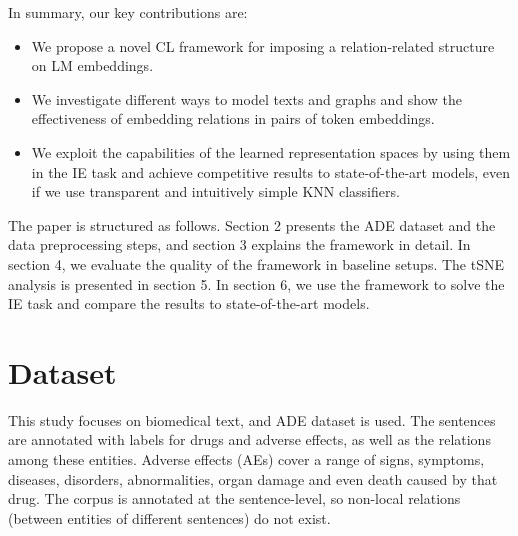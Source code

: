 \documentclass[11pt]{article}
\begin{document}
\par 
In summary, our key contributions are:
\vspace{-0.5mm}
\begin{itemize}
    \item We propose a novel CL framework for imposing a relation-related
structure on LM embeddings.
\vspace{-0.5mm}
    \item We investigate different ways to model texts and graphs and show the effectiveness of embedding relations in pairs of token embeddings.
\vspace{-0.5mm}
    \item 
    We exploit the capabilities of the learned representation spaces by using them in the IE task and achieve competitive results to state-of-the-art models, even if we use transparent and intuitively simple KNN classifiers. 
\end{itemize}

\par
The paper is structured as follows. Section 2 presents the ADE dataset and the data preprocessing steps, and section 3 explains the framework in detail. In section 4, we evaluate the quality of the framework in baseline setups. The tSNE analysis is presented in section 5. In section 6, we use the framework to solve the IE task and compare the results to state-of-the-art models.

\vspace{-1mm}
 
\section{Dataset}

This study focuses on biomedical text, and ADE dataset is used. The sentences are annotated with labels for drugs and adverse effects, as well as the relations among these entities. Adverse effects (AEs) cover a range of signs, symptoms, diseases, disorders, abnormalities, organ damage and even death caused by that drug. The corpus is annotated at the sentence-level, so non-local relations (between entities of different sentences) do not exist. 

\vspace{-1mm}
\end{document}
